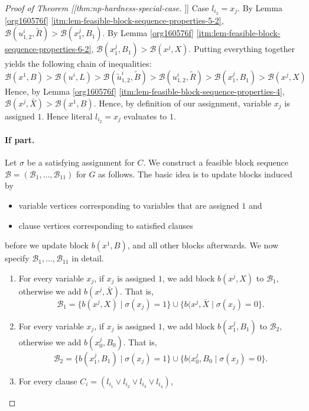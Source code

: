 \documentclass[fontsize=11pt,paper=a4]{book}
\begin{document}
\begin{proof}[Proof of Theorem [[thm:np-hardness-special-case]]]
Case \(l_{i_2}=x_j\).
By Lemma \ref{org160576f} \ref{itm:lem-feasible-block-sequence-properties-5-2}, \(\mathcal{B}(u_{1,2}^i,\tilde{R})>\mathcal{B}(x_1^j,B_1)\).
By Lemma \ref{org160576f} \ref{itm:lem-feasible-block-sequence-properties-6-2}, \(\mathcal{B}(x_1^j,B_1)>\mathcal{B}(x^j,X)\).
Putting everything together yields the following chain of inequalities:
\[
\mathcal{B}(x^1,B)>
\mathcal{B}(u^i,L)>
\mathcal{B}(\tilde{u}_{1,2}^i,\tilde{B})>
\mathcal{B}(u_{1,2}^i,\tilde{R})>
\mathcal{B}(x_1^j,B_1)>
\mathcal{B}(x^j,X)
\]
Hence, by Lemma \ref{org160576f} \ref{itm:lem-feasible-block-sequence-properties-4}, \(\mathcal{B}(x^j,\bar{X})>\mathcal{B}(x^1,B)\).
Hence, by definition of our assignment, variable \(x_j\) is assigned \(1\).
Hence literal \(l_{i_2}=x_j\) evaluates to \(1\).

\paragraph{If part.}
Let \(\sigma\) be a satisfying assignment for \(C\).
We construct a feasible block sequence \(\mathcal{B}=(\mathscr{B}_1,\dots,\mathscr{B}_{11})\) for \(G\) as follows.
The basic idea is to update blocks induced by

\begin{itemize}
\item variable vertices corresponding to variables that are assigned \(1\) and

\item clause vertices corresponding to satisfied clauses
\end{itemize}


before we update block \(b(x^1,B)\), and all other blocks afterwards.
We now specify \(\mathscr{B}_1,\dots,\mathscr{B}_{11}\) in detail.

\begin{enumerate}
\item For every variable \(x_j\), if \(x_j\) is assigned \(1\), we add block \(b(x^j,X)\) to \(\mathscr{B}_1\), otherwise we add \(b(x^j,\bar{X})\).
That is,
\[
   \mathscr{B}_1=\{b(x^j,X)\mid\sigma(x_j)=1\}\cup\{b(x^j,\bar{X}\mid\sigma(x_j)=0\}.
   \]

\item For every variable \(x_j\), if \(x_j\) is assigned \(1\), we add block \(b(x_1^j,B_1)\) to \(\mathscr{B}_2\), otherwise we add \(b(x_0^j,B_0)\).
That is,
\[
   \mathscr{B}_2=\{b(x_1^j,B_1)\mid\sigma(x_j)=1\}\cup\{b(x_0^j,B_0\mid\sigma(x_j)=0\}.
   \]

\item For every clause \(C_i=(l_{i_1}\vee l_{i_2}\vee l_{i_3}\vee l_{i_4})\),


\end{enumerate}
\end{proof}
\end{document}

